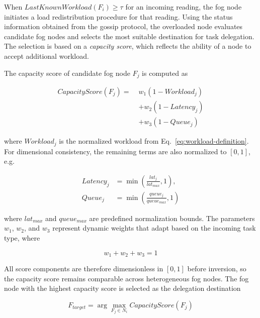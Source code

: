 \documentclass[conference]{IEEEtran}
\begin{document}
    When $LastKnownWorkload(F_i)\geq\tau$ for an incoming reading, the fog node initiates a load redistribution procedure for that reading. Using the status information obtained from the gossip protocol, the overloaded node evaluates candidate fog nodes and selects the most suitable destination for task delegation. The selection is based on a \textit{capacity score}, which reflects the ability of a node to accept additional workload.

    The capacity score of candidate fog node $F_j$ is computed as

    \begin{equation}
    \begin{aligned}
    CapacityScore(F_j) =\;& w_1(1-Workload_j) \\
    &+ w_2(1-Latency_j) \\
    &+ w_3(1-Queue_j)
    \end{aligned}
    \end{equation}

    where $Workload_j$ is the normalized workload from Eq.~\eqref{eq:workload-definition}. For dimensional consistency, the remaining terms are also normalized to $[0,1]$, e.g.

    \begin{equation}
    \begin{aligned}
    Latency_j &= \min\!\left(\frac{lat_j}{lat_{max}},1\right),\\
    Queue_j &= \min\!\left(\frac{queue_j}{queue_{max}},1\right)
    \end{aligned}
    \end{equation}

    where $lat_{max}$ and $queue_{max}$ are predefined normalization bounds. The parameters $w_1$, $w_2$, and $w_3$ represent dynamic weights that adapt based on the incoming task type, where

    \begin{equation}
    w_1 + w_2 + w_3 = 1
    \end{equation}

    All score components are therefore dimensionless in $[0,1]$ before inversion, so the capacity score remains comparable across heterogeneous fog nodes. The fog node with the highest capacity score is selected as the delegation destination

    \begin{equation}
    F_{target} = \arg\max_{F_j \in N_i} CapacityScore(F_j)
    \end{equation}
\end{document}
